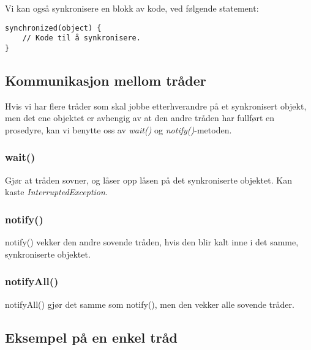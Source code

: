 \documentclass[11pt]{article}
\begin{document}
Vi kan også synkronisere en blokk av kode, ved følgende statement:

\begin{verbatim}
synchronized(object) { 
    // Kode til å synkronisere.
}
\end{verbatim}
\subsection{Kommunikasjon mellom tråder}
\label{sec-18_4}


Hvis vi har flere tråder som skal jobbe etterhverandre på et
synkronisert objekt, men det ene objektet er avhengig av at den andre
tråden har fullført en prosedyre, kan vi benytte oss av \emph{wait()} og
\emph{notify()}-metoden. 
\subsubsection{wait()}
\label{sec-18_4_1}


Gjør at tråden sovner, og låser opp låsen på det synkroniserte
objektet. Kan kaste \emph{InterruptedException}.
\subsubsection{notify()}
\label{sec-18_4_2}


notify() vekker den andre sovende tråden, hvis den blir kalt inne i
det samme, synkroniserte objektet.
\subsubsection{notifyAll()}
\label{sec-18_4_3}


notifyAll() gjør det samme som notify(), men den vekker alle sovende tråder.
\subsection{Eksempel på en enkel tråd}
\label{sec-18_5}
\end{document}
